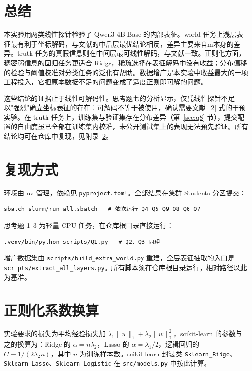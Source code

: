 \documentclass[UTF8,11pt,a4paper]{article}
\begin{document}
\section{总结}

本实验用两类线性探针检验了 Qwen3-4B-Base 的内部表征。world 任务上浅层表征最有利于坐标解码，与文献的中后层最优结论相反，差异主要来自m本身的差异。truth 任务的真假信息则在中间层最可线性解码，与文献一致。正则化方面，稠密弱信息的回归任务更适合 Ridge，稀疏选择在表征解码中没有收益；分布偏移的检验与阈值校准对分类任务的泛化有帮助。数据增广是本实验中收益最大的一项工程投入，它把原本数据不足的问题变成了适度正则即可解的问题。

这些结论的证据止于线性可解码性。思考题七的分析显示，仅凭线性探针不足以"强烈"确立坐标表征的存在：可解码不等于被使用，确认需要文献~[2] 式的干预实验。在 truth 任务上，训练集与验证集存在分布差异（第~\ref{sec:q8} 节），提交配置的自由度虽已全部在训练集内校准，未公开测试集上的表现无法预先验证。所有结论均可在仓库中复现，见附录~\ref{app:repro}。

\appendix

\section{复现方式}
\label{app:repro}

环境由 uv 管理，依赖见 \texttt{pyproject.toml}。全部结果在集群 Students 分区提交：
\begin{lstlisting}
sbatch slurm/run_all.sbatch   # 依次运行 Q4 Q5 Q9 Q8 Q6 Q7
\end{lstlisting}
思考题 1--3 为轻量 CPU 任务，在仓库根目录直接运行：
\begin{lstlisting}
.venv/bin/python scripts/Q1.py   # Q2、Q3 同理
\end{lstlisting}
增广数据集由 \texttt{scripts/build\_extra\_world.py} 重建，全层表征抽取的入口是 \texttt{scripts/extract\_all\_layers.py}。所有脚本须在仓库根目录运行，相对路径以此为基准。

\section{正则化系数换算}
\label{app:conv}

实验要求的损失为平均经验损失加 $\lambda_1\|w\|_1+\lambda_2\|w\|_2^2$，scikit-learn 的参数与之的换算为：Ridge 的 $\alpha=n\lambda_2$，Lasso 的 $\alpha=\lambda_1/2$，逻辑回归的 $C=1/(2\lambda_2 n)$，其中 $n$ 为训练样本数。scikit-learn 封装类 \texttt{Sklearn\_Ridge}、\texttt{Sklearn\_Lasso}、\texttt{Sklearn\_Logistic} 在 \texttt{src/models.py} 中按此计算。
\end{document}
